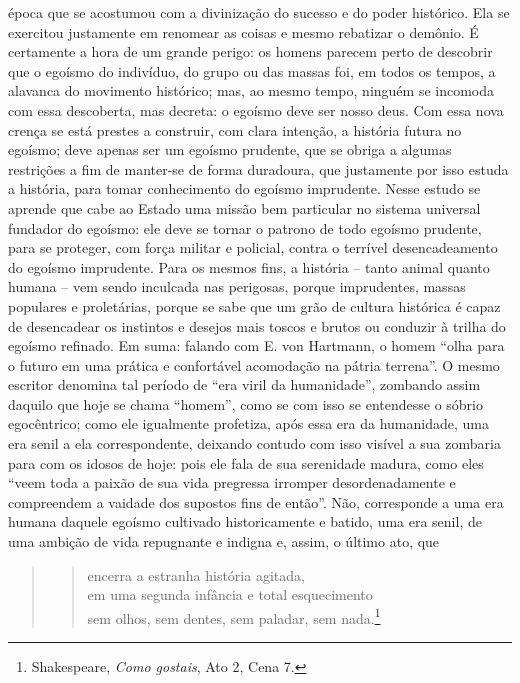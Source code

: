     época que se acostumou com a divinização do sucesso e do poder
    histórico. Ela se exercitou justamente em renomear as coisas e mesmo
    rebatizar o demônio. É certamente a hora de um grande perigo: os
    homens parecem perto de descobrir que o egoísmo do indivíduo, do
    grupo ou das massas foi, em todos os tempos, a alavanca do movimento
    histórico; mas, ao mesmo tempo, ninguém se incomoda com essa
    descoberta, mas decreta: o egoísmo deve ser nosso deus. Com essa
    nova crença se está prestes a construir, com clara intenção, a
    história futura no egoísmo; deve apenas ser um egoísmo prudente, que
    se obriga a algumas restrições a fim de manter-se de forma
    duradoura, que justamente por isso estuda a história, para tomar
    conhecimento do egoísmo imprudente. Nesse estudo se aprende que cabe
    ao Estado uma missão bem particular no sistema universal fundador do
    egoísmo: ele deve se tornar o patrono de todo egoísmo prudente, para
    se proteger, com força militar e policial, contra o terrível
    desencadeamento do egoísmo imprudente. Para os mesmos fins, a
    história -- tanto animal quanto humana -- vem sendo inculcada nas
    perigosas, porque imprudentes, massas populares e proletárias,
    porque se sabe que um grão de cultura histórica é capaz de
    desencadear os instintos e desejos mais toscos e brutos ou conduzir
    à trilha do egoísmo refinado. Em suma: falando com E. von Hartmann,
    o homem ``olha para o futuro em uma prática e confortável acomodação
    na pátria terrena''. O mesmo escritor denomina tal período de ``era
    viril da humanidade'', zombando assim daquilo que hoje se chama
    ``homem'', como se com isso se entendesse o sóbrio egocêntrico; como
    ele igualmente profetiza, após essa era da humanidade, uma era senil
    a ela correspondente, deixando contudo com isso visível a sua
    zombaria para com os idosos de hoje: pois ele fala de sua serenidade
    madura, como eles ``veem toda a paixão de sua vida pregressa
    irromper desordenadamente e compreendem a vaidade dos supostos fins
    de então''. Não, corresponde a uma era humana daquele egoísmo
    cultivado historicamente e batido, uma era senil, de uma ambição de
    vida repugnante e indigna e, assim, o último ato, que 

 \begin{quote}
 \begin{verse}
encerra a estranha história agitada,\\
em uma segunda infância e total esquecimento\\
sem olhos, sem dentes, sem paladar, sem nada.\footnote{Shakespeare,
  \emph{Como gostais}, Ato 2, Cena 7.}
 \end{verse}
 \end{quote}
  

